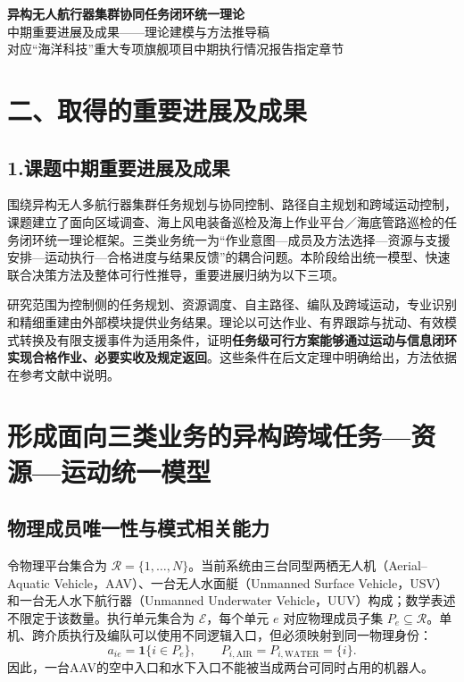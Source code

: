 \documentclass[UTF8,fontset=fandol,a4paper,11pt]{ctexart}
\newcommand{\ind}{\mathbf 1}
\begin{document}
\begin{center}
  {\LARGE\bfseries 异构无人航行器集群协同任务闭环统一理论}\\[0.6em]
  {\large 中期重要进展及成果——理论建模与方法推导稿}\\[0.5em]
  {\small 对应“海洋科技”重大专项旗舰项目中期执行情况报告指定章节}
\end{center}

\section*{二、取得的重要进展及成果}
\subsection*{1.课题中期重要进展及成果}

围绕异构无人多航行器集群任务规划与协同控制、路径自主规划和跨域运动控制，课题建立了面向区域调查、海上风电装备巡检及海上作业平台／海底管路巡检的任务闭环统一理论框架。三类业务统一为“作业意图—成员及方法选择—资源与支援安排—运动执行—合格进度与结果反馈”的耦合问题。本阶段给出统一模型、快速联合决策方法及整体可行性推导，重要进展归纳为以下三项。

研究范围为控制侧的任务规划、资源调度、自主路径、编队及跨域运动，专业识别和精细重建由外部模块提供业务结果。理论以可达作业、有界跟踪与扰动、有效模式转换及有限支援事件为适用条件，证明\textbf{任务级可行方案能够通过运动与信息闭环实现合格作业、必要实收及规定返回}。这些条件在后文定理中明确给出，方法依据在参考文献中说明。

\section{形成面向三类业务的异构跨域任务—资源—运动统一模型}
\subsection{物理成员唯一性与模式相关能力}

令物理平台集合为 $\mathcal R=\{1,\ldots,N\}$。当前系统由三台同型两栖无人机（Aerial--Aquatic Vehicle，AAV）、一台无人水面艇（Unmanned Surface Vehicle，USV）和一台无人水下航行器（Unmanned Underwater Vehicle，UUV）构成；数学表述不限定于该数量。执行单元集合为 $\mathcal E$，每个单元 $e$ 对应物理成员子集 $P_e\subseteq\mathcal R$。单机、跨介质执行及编队可以使用不同逻辑入口，但必须映射到同一物理身份：
\begin{equation}
 a_{ie}=\ind\{i\in P_e\},\qquad
 P_{i,\mathrm{AIR}}=P_{i,\mathrm{WATER}}=\{i\}.
 \label{eq:identity}
\end{equation}
因此，一台AAV的空中入口和水下入口不能被当成两台可同时占用的机器人。
\end{document}
